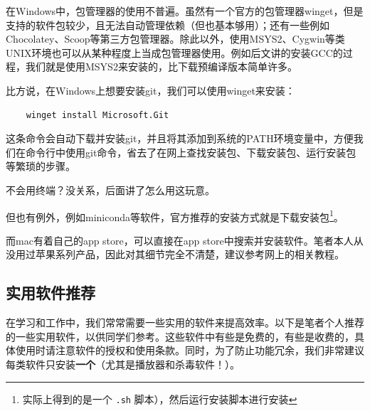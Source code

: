 在Windows中，包管理器的使用不普遍。虽然有一个官方的包管理器winget，但是支持的软件包较少，且无法自动管理依赖（但也基本够用）；还有一些例如Chocolatey、Scoop等第三方包管理器。除此以外，使用MSYS2、Cygwin等类UNIX环境也可以从某种程度上当成包管理器使用。例如后文讲的安装GCC的过程，我们就是使用MSYS2来安装的，比下载预编译版本简单许多。

比方说，在Windows上想要安装git，我们可以使用winget来安装：
\begin{verbatim}
    winget install Microsoft.Git 
\end{verbatim}
这条命令会自动下载并安装git，并且将其添加到系统的PATH环境变量中，方便我们在命令行中使用git命令，省去了在网上查找安装包、下载安装包、运行安装包等繁琐的步骤。

不会用终端？没关系，后面讲了怎么用这玩意。

但也有例外，例如miniconda等软件，官方推荐的安装方式就是下载安装包\footnote{实际上得到的是一个 \texttt{.sh} 脚本），然后运行安装脚本进行安装}。

而mac有着自己的app store，可以直接在app store中搜索并安装软件。笔者本人从没用过苹果系列产品，因此对其细节完全不清楚，建议参考网上的相关教程。



\subsection{实用软件推荐}

在学习和工作中，我们常常需要一些实用的软件来提高效率。以下是笔者个人推荐的一些实用软件，以供同学们参考。这些软件中有些是免费的，有些是收费的，具体使用时请注意软件的授权和使用条款。同时，为了防止功能冗余，我们非常建议每类软件只安装\textbf{一个}（尤其是播放器和杀毒软件！）。

